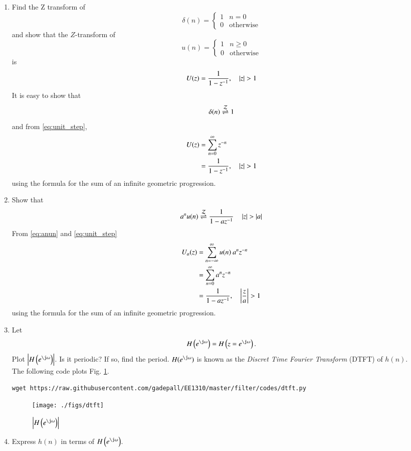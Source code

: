 \documentclass[journal,12pt,twocolumn]{IEEEtran}
\renewcommand\thesection{\arabic{section}}
\begin{document}
\begin{enumerate}[label=\thesection.\arabic*]
%
\item Find the Z transform of 
\begin{equation}
\delta(n)
=
\begin{cases}
1 & n = 0
\\
0 & \text{otherwise}
\end{cases}
\end{equation}
and show that the $Z$-transform of
\begin{equation}
\label{eq:unit_step}
u(n)
=
\begin{cases}
1 & n \ge 0
\\
0 & \text{otherwise}
\end{cases}
\end{equation}
is
\begin{equation}
U(z) = \frac{1}{1-z^{-1}}, \quad \left\vert z\right\vert > 1
\end{equation}
\solution It is easy to show that
\begin{equation}
\delta(n) \overset{\mathcal{Z}}{ \rightleftharpoons} 1
\end{equation}
and from \eqref{eq:unit_step},
\begin{align}
U(z) &= \sum _{n= 0}^{\infty}z^{-n}
\\
&=\frac{1}{1-z^{-1}}, \quad \left\vert z\right\vert > 1
\end{align}
using the formula for the sum of an infinite geometric progression.
%
\item Show that 
\begin{equation}
\label{eq:anun}
a^nu(n) \overset{\mathcal{Z}}{ \rightleftharpoons} \frac{1}{1-az^{-1}} \quad \left\vert z\right\vert > \left\vert a\right\vert
\end{equation}
%
\solution From \eqref{eq:anun} and \eqref{eq:unit_step}
\begin{align}
U_{a}(z) &= \sum _{n= -\infty}^{\infty}u(n)\:a^{n}z^{-n}
\\
&= \sum _{n= 0}^{\infty}a^{n}z^{-n}
\\
&=\frac{1}{1-az^{-1}}, \quad \left\vert\frac{z}{a}\right\vert > 1
\end{align}
using the formula for the sum of an infinite geometric progression.
\item 
Let
\begin{equation}
H\brak{e^{\j \omega}} = H\brak{z = e^{\j \omega}}.
\end{equation}
Plot $\abs{H\brak{e^{\j \omega}}}$.  Is it periodic? If so, find the period. $H(e^{\j \omega})$ is
known as the {\em Discret Time Fourier Transform} (DTFT) of $h(n)$.
\\
\solution The following code plots Fig. \ref{fig:dtft}.
\begin{lstlisting}
wget https://raw.githubusercontent.com/gadepall/EE1310/master/filter/codes/dtft.py
\end{lstlisting}
\begin{figure}[!ht]
\centering
\texttt{[image: ./figs/dtft]}
\caption{$\abs{H\brak{e^{\j\omega}}}$}
\label{fig:dtft}
\end{figure}
\item Express $h(n)$ in terms of $H\brak{e^{\j \omega}}$.
\end{enumerate}
\end{document}
